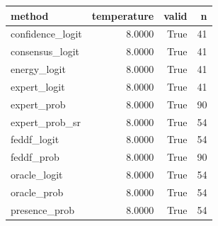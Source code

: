 \begin{tabular}{lrrr}
\toprule
method & temperature & valid & n \\
\midrule
confidence\_logit & 8.0000 & True & 41 \\
consensus\_logit & 8.0000 & True & 41 \\
energy\_logit & 8.0000 & True & 41 \\
expert\_logit & 8.0000 & True & 41 \\
expert\_prob & 8.0000 & True & 90 \\
expert\_prob\_sr & 8.0000 & True & 54 \\
feddf\_logit & 8.0000 & True & 54 \\
feddf\_prob & 8.0000 & True & 90 \\
oracle\_logit & 8.0000 & True & 54 \\
oracle\_prob & 8.0000 & True & 54 \\
presence\_prob & 8.0000 & True & 54 \\
\bottomrule
\end{tabular}
